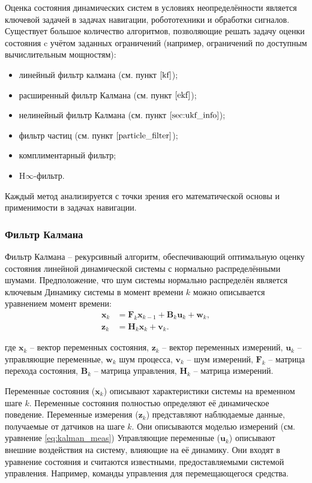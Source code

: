 Оценка состояния динамических систем в условиях неопределённости является ключевой задачей в задачах навигации,
робототехники и обработки сигналов.
Существует большое количество алгоритмов, позволяющие решать задачу оценки состояния
c учётом заданных ограничений (например, ограничений по доступным вычислительным мощностям):
\begin{itemize}
	\item линейный фильтр калмана (см. пункт $\ref{kf}$);
	\item расширенный фильтр Калмана (см. пункт $\ref{ekf}$);
	\item нелинейный фильтр Калмана (см. пункт $\ref{sec:ukf_info}$);
	\item фильтр частиц (см. пункт $\ref{particle_filter}$);
	\item комплиментарный фильтр;
	\item H$\infty$-фильтр.
\end{itemize}
Каждый метод анализируется с точки зрения его математической основы и применимости в задачах навигации.

\subsubsection{Фильтр Калмана}
\label{kf}
\hfill

Фильтр Калмана -- рекурсивный алгоритм,
обеспечивающий оптимальную оценку состояния линейной динамической системы с нормально распределёнными шумами.
Предположение, что шум системы нормально распределён является ключевым 
Динамику системы в момент времени \( k \) можно описывается уравнением момент времени:
\begin{align}
    \mathbf{x}_k &= \mathbf{F}_k \mathbf{x}_{k-1} + \mathbf{B}_k \mathbf{u}_k + \mathbf{w}_k, \label{eq:kalman_state} \\
    \mathbf{z}_k &= \mathbf{H}_k \mathbf{x}_k + \mathbf{v}_k. \label{eq:kalman_meas}
\end{align}

где \(\mathbf{x}_k\) -- вектор переменных состояния, \(\mathbf{z}_k\) -- вектор переменных измерений,
\(\mathbf{u}_k\) -- управляющие переменные, \(\mathbf{w}_k\) шум процесса,
\(\mathbf{v}_k \) -- шум измерений, \(\mathbf{F}_k\) -- матрица перехода состояния,
\(\mathbf{B}_k\) -- матрица управления, \(\mathbf{H}_k\) -- матрица измерений.

Переменные состояния (\(\mathbf{x}_k\)) описывают характеристики системы на временном шаге \( k \).
Переменные состояния полностью определяют её динамическое поведение.
Переменные измерения (\(\mathbf{z}_k\)) представляют наблюдаемые данные, получаемые от датчиков на шаге \( k \). 
Они описываются моделью измерений (см. уравнение \ref{eq:kalman_meas})
Управляющие переменные (\(\mathbf{u}_k\)) описывают внешние воздействия на систему, влияющие на её динамику.
Они входят в уравнение состояния и считаются известными, предоставляемыми системой управления.
Например, команды управления для перемещающегося средства.

